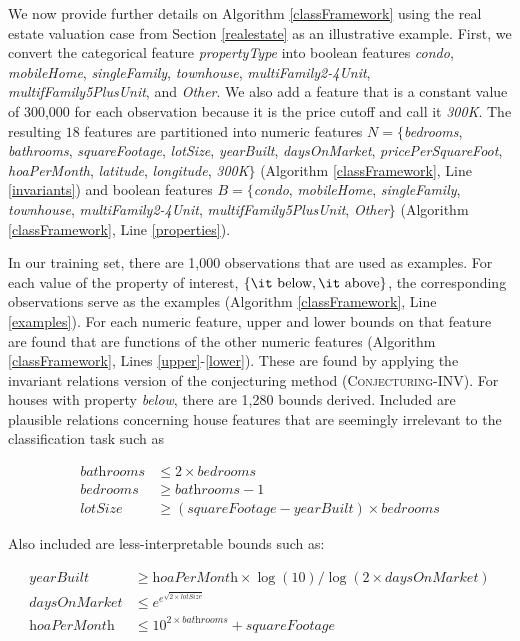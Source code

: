\documentclass[ijds,nonblindrev]{informs-ijds}
\begin{document}
We now provide further details on Algorithm \ref{classFramework} using the real estate valuation case from Section \ref{realestate} as an illustrative example.  First, we convert the categorical feature {\it propertyType} into boolean features {\it condo}, {\it mobileHome}, {\it singleFamily}, {\it townhouse}, {\it multiFamily2-4Unit}, {\it multifFamily5PlusUnit}, and {\it Other}.  We also add a feature that is a constant value of 300,000 for each observation because it is the price cutoff and call it {\it 300K}.  The resulting $18$ features are partitioned into numeric features $N=\{${\it bedrooms}, {\it bathrooms}, {\it squareFootage}, {\it lotSize}, {\it yearBuilt}, {\it daysOnMarket}, {\it pricePerSquareFoot}, {\it hoaPerMonth}, {\it latitude}, {\it longitude}, {\it 300K}$\}$ (Algorithm \ref{classFramework}, Line \ref{invariants}) and boolean features $B = \{${\it condo}, {\it mobileHome}, {\it singleFamily}, {\it townhouse}, {\it multiFamily2-4Unit}, {\it multifFamily5PlusUnit}, {\it Other}$\}$ (Algorithm \ref{classFramework}, Line \ref{properties}).

In our training set, there are 1,000 observations that are used as examples.  For each value of the property of interest, $\{\textrm{\it below}, \textrm{\it above}\}$, the corresponding observations serve as the examples (Algorithm \ref{classFramework}, Line \ref{examples}).  For each numeric feature, upper and lower bounds on that feature are found that are functions of the other numeric features (Algorithm \ref{classFramework}, Lines \ref{upper}-\ref{lower}).  These are found by applying the invariant relations version of the conjecturing method (\textsc{Conjecturing-INV}).   For houses with property {\it below}, there are 1,280 bounds derived.  Included are plausible relations concerning house features that are seemingly irrelevant to the classification task such as 

\begin{align}
\textit{bathrooms} & \leq  2 \times \textit{bedrooms} \\
\textit {bedrooms} & \geq  \textit {bathrooms} - 1\\
\textit {lotSize} & \geq  (\textit{squareFootage} - \textit{yearBuilt})\times \textit{bedrooms} 
\end{align}

Also included are less-interpretable bounds such as:

\begin{align}
\textit{yearBuilt} & \geq  \textit{hoaPerMonth} \times \log(10) /\log(2\times\textit{daysOnMarket})\\
\textit{daysOnMarket} & \leq  e^{e^{\sqrt{2\times \textit{lotSize}}}} \\
\textit{hoaPerMonth} & \leq  10^{2\times \textit{bathrooms}} + \textit{squareFootage} 
\end{align}
\end{document}
